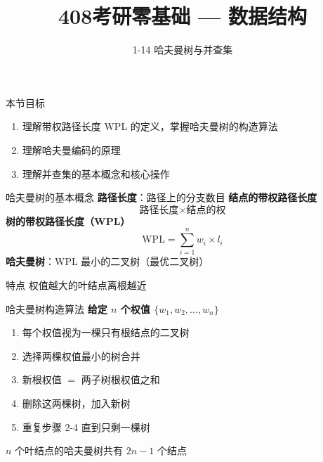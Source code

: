 \documentclass[10pt, aspectratio=169]{beamer}
\title{408考研零基础 --- 数据结构}
\subtitle{1-14 哈夫曼树与并查集}
\author{}
\date{}
\begin{document}
\begin{frame}{本节目标}
    \begin{enumerate}
        \item 理解带权路径长度 WPL 的定义，掌握哈夫曼树的构造算法
        \item 理解哈夫曼编码的原理
        \item 理解并查集的基本概念和核心操作
    \end{enumerate}
\end{frame}

\begin{frame}{哈夫曼树的基本概念}
    \textbf{路径长度}：路径上的分支数目
    \vspace{0.3em}
    \textbf{结点的带权路径长度}
    \[
    \text{路径长度} \times \text{结点的权}
    \]
    \vspace{0.3em}
    \textbf{树的带权路径长度（WPL）}
    \[
    \text{WPL} = \sum_{i=1}^{n} w_i \times l_i
    \]
    \vspace{0.3em}
    \textbf{哈夫曼树}：WPL 最小的二叉树（最优二叉树）
    \vspace{0.3em}
    \begin{block}{特点}
        权值越大的叶结点离根越近
    \end{block}
\end{frame}

\begin{frame}{哈夫曼树构造算法}
    \textbf{给定 $n$ 个权值 $\{w_1, w_2, \ldots, w_n\}$}
    \vspace{0.3em}
    \begin{enumerate}
        \item 每个权值视为一棵只有根结点的二叉树
        \item 选择两棵权值最小的树合并
        \item 新根权值 $=$ 两子树根权值之和
        \item 删除这两棵树，加入新树
        \item 重复步骤 2-4 直到只剩一棵树
    \end{enumerate}
    \vspace{0.3em}
    $n$ 个叶结点的哈夫曼树共有 $2n - 1$ 个结点
\end{frame}
\end{document}
